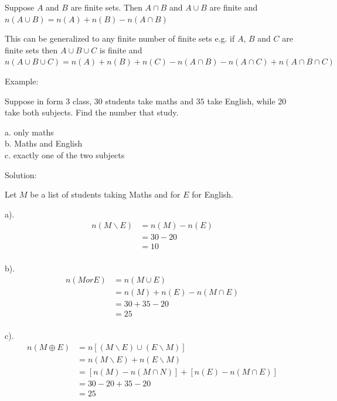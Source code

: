 \begin{theorem}
    Suppose $A$ and $B$ are finite sets. Then $A \cap B$ and $A \cup B$ are finite and $n(A \cup B) = n(A) + n(B) - n(A \cap B)$

    This can be generalized to any finite number of finite sets e.g. if $A$, $B$ and $C$ are finite sets then $A \cup B \cup C$ is finite and $n(A \cup B \cup C) = n(A) + n(B) + n(C) - n(A \cap B) - n(A \cap C) + n(A \cap B \cap C)$
\end{theorem}

Example:

Suppose in form $3$ class, $30$ students take maths and $35$ take English, while $20$ take both subjects. Find the number that study.

a. only maths \\
b. Maths and English\\
c. exactly one of the two subjects

Solution:

Let $M$ be a list of students taking Maths and for $E$ for English.

a).\begin{align*}
    n(M \backslash E) & = n(M) - n(E) \\
                      & = 30 - 20     \\
                      & =10           \\
\end{align*}

b). \begin{align*}
    n(M or E) & = n(M \cup E)               \\
              & = n(M) + n(E) - n(M \cap E) \\
              & = 30 + 35 - 20              \\
              & = 25                        \\
\end{align*}

c). \begin{align*}
    n(M \oplus E) & = n[(M \backslash E) \cup (E \backslash M)]   \\
                  & = n(M \backslash E) + n(E \backslash M)       \\
                  & = [n(M) - n(M \cap N)] + [n(E) - n(M \cap E)] \\
                  & = 30 - 20 + 35 - 20                           \\
                  & = 25                                          \\
\end{align*}

